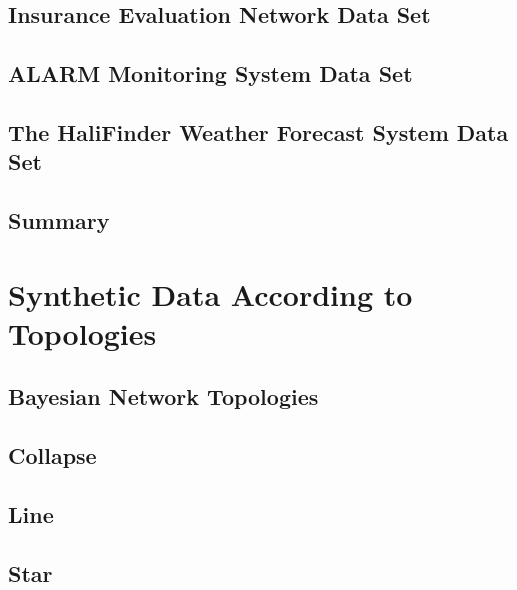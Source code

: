 \documentclass[12pt,a4paper,oneside]{book}
\theoremstyle{plain}
\theoremstyle{definition}
\theoremstyle{remark}
\theoremstyle{definition}
\numberwithin{equation}{chapter}
\begin{document}
\newpage{}

\subsection{Insurance Evaluation Network Data Set}


\newpage{}

\subsection{ALARM Monitoring System Data Set}


\newpage{}

\subsection{The HaliFinder Weather Forecast System Data Set}


\newpage{}

\subsection{Summary}


\newpage{}

\section{Synthetic Data According to Topologies}

\subsection{Bayesian Network Topologies}


\newpage{}

\subsection{Collapse}


\newpage{}

\subsection{Line}


\newpage{}
	
\subsection{Star}

\end{document}

